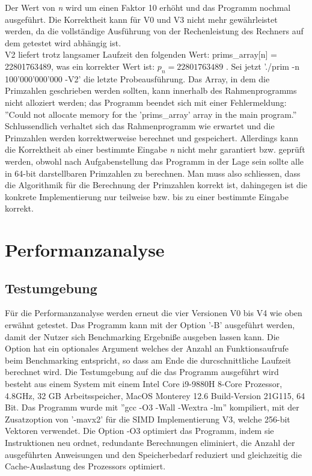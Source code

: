\documentclass[course=erap]{aspdoc}
\begin{document}
  \begin{flushright}\cite[WolframAlpha]{wAlpha2} \end{flushright}
Der Wert von \textit{n} wird um einen Faktor 10 erhöht und das Programm nochmal ausgeführt. Die Korrektheit kann für V0 und V3 nicht mehr gewährleistet werden, da die vollständige Ausführung von der Rechenleistung des Rechners auf dem getestet wird abhängig ist.\\V2 liefert trotz langsamer Laufzeit den folgenden Wert: prims\_array[n] = 22801763489, was ein korrekter Wert ist: $p_n = 22801763489 $ \cite[WolframAlpha]{wAlpha3}.
Sei jetzt './prim -n 100'000'000'000 -V2' die letzte Probeausführung. Das Array, in dem die Primzahlen geschrieben werden sollten, kann innerhalb des Rahmenprogramms nicht alloziert werden; das Programm beendet sich mit einer Fehlermeldung: ''Could not allocate memory for the 'prims\_array' array in the main program.'' Schlussendlich verhaltet sich das Rahmenprogramm wie erwartet und die Primzahlen werden korrektwerweise berechnet und gespeichert. Allerdings kann die Korrektheit ab einer bestimmte Eingabe \textit{n} nicht mehr garantiert bzw. geprüft werden, obwohl nach Aufgabenstellung das Programm in der Lage sein sollte alle in 64-bit darstellbaren Primzahlen zu berechnen. Man muss also schliessen, dass die Algorithmik für die Berechnung der Primzahlen korrekt ist, dahingegen ist die konkrete Implementierung nur teilweise bzw. bis zu einer bestimmte Eingabe korrekt.
\section{Performanzanalyse}
\subsection{Testumgebung}
Für die Performanzanalyse werden erneut die vier Versionen V0 bis V4 wie oben erwähnt getestet. Das Programm kann mit der Option '-B' ausgeführt werden, damit der Nutzer sich Benchmarking Ergebniße ausgeben lassen kann. Die Option hat ein optionales Argument welches der Anzahl an Funktionsaufrufe beim Benchmarking entspricht, so dass am Ende die durcschnittliche Laufzeit berechnet wird.  
Die Testumgebung auf die das Programm ausgeführt wird besteht aus einem System mit einem Intel Core i9-9880H 8-Core Prozessor, 4.8GHz, 32 GB Arbeitsspeicher, MacOS Monterey 12.6 Build-Version 21G115, 64 Bit.
Das Programm wurde mit ''gcc -O3 -Wall -Wextra -lm'' kompiliert, mit der Zusatzoption von '-mavx2' für die SIMD Implementierung V3, welche 256-bit Vektoren verwendet. Die Option -O3 optimiert das Programm, indem sie Instruktionen neu ordnet, redundante Berechnungen eliminiert, die Anzahl der ausgeführten Anweisungen und den Speicherbedarf reduziert und gleichzeitig die Cache-Auslastung des Prozessors optimiert. 
\end{document}

